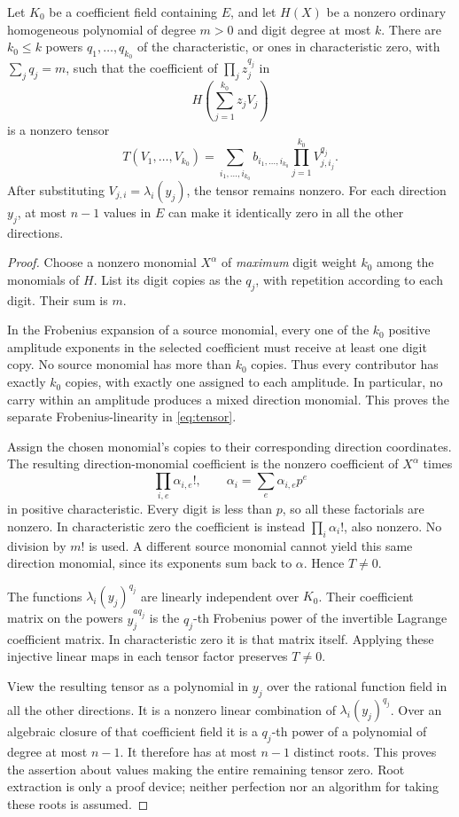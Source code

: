 \begin{lemma}\label{lem:tensor}
Let $K_0$ be a coefficient field containing $E$, and let $H(X)$ be a
nonzero ordinary homogeneous polynomial of degree $m>0$ and digit
degree at most $k$. There are $k_0\le k$ powers
$q_1,\ldots,q_{k_0}$ of the characteristic, or ones in characteristic
zero, with $\sum_jq_j=m$, such that the coefficient of
$\prod_jz_j^{q_j}$ in
\[
 H\left(\sum_{j=1}^{k_0}z_jV_j\right)
\]
is a nonzero tensor
\begin{equation}\label{eq:tensor}
 T(V_1,\ldots,V_{k_0})
   =\sum_{i_1,\ldots,i_{k_0}}b_{i_1,\ldots,i_{k_0}}
                        \prod_{j=1}^{k_0}V_{j,i_j}^{q_j}.
\end{equation}
After substituting $V_{j,i}=\lambda_i(y_j)$, the tensor remains
nonzero. For each direction $y_j$, at most $n-1$ values in $E$
can make it identically zero in all the other directions.
\end{lemma}
\begin{proof}
Choose a nonzero monomial $X^\alpha$ of \emph{maximum} digit weight
$k_0$ among the monomials of $H$. List its digit copies as the
$q_j$, with repetition according to each digit. Their sum is $m$.

In the Frobenius expansion of a source monomial, every one of the
$k_0$ positive amplitude exponents in the selected coefficient must
receive at least one digit copy. No source monomial has more than
$k_0$ copies. Thus every contributor has exactly $k_0$ copies, with
exactly one assigned to each amplitude. In particular, no carry
within an amplitude produces a mixed direction monomial. This proves
the separate Frobenius-linearity in \eqref{eq:tensor}.

Assign the chosen monomial's copies to their corresponding direction
coordinates. The resulting direction-monomial coefficient is the
nonzero coefficient of $X^\alpha$ times
\[
 \prod_{i,e}\alpha_{i,e}!,
 \qquad \alpha_i=\sum_e\alpha_{i,e}p^e
\]
in positive characteristic. Every digit is less than $p$, so all
these factorials are nonzero. In characteristic zero the coefficient
is instead $\prod_i\alpha_i!$, also nonzero. No division by $m!$
is used. A different source monomial cannot yield this same direction
monomial, since its exponents sum back to $\alpha$. Hence $T\ne0$.

The functions $\lambda_i(y_j)^{q_j}$ are linearly independent over
$K_0$. Their coefficient matrix on the powers $y_j^{a q_j}$ is
the $q_j$-th Frobenius power of the invertible Lagrange coefficient
matrix. In characteristic zero it is that matrix itself. Applying
these injective linear maps in each tensor factor preserves $T\ne0$.

View the resulting tensor as a polynomial in $y_j$ over the rational
function field in all the other directions. It is a nonzero linear
combination of $\lambda_i(y_j)^{q_j}$. Over an algebraic closure of
that coefficient field it is a $q_j$-th power of a polynomial of
degree at most $n-1$. It therefore has at most $n-1$ distinct roots.
This proves the assertion about values making the entire remaining
tensor zero. Root extraction is only a proof device; neither
perfection nor an algorithm for taking these roots is assumed.
\end{proof}

